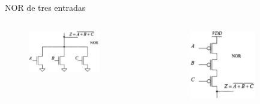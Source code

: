 \documentclass[aspectratio=169,t]{beamer}
\begin{document}
\begin{frame}{NOR de tres entradas}

\begin{columns}

\begin{column}{0.5\textwidth}

\begin{figure}
    \centering
    \includegraphics[width=0.7\textwidth]{figuras/aoi_nor_1.png}
\end{figure}

\end{column}

\begin{column}{0.5\textwidth}

\begin{figure}
    \centering
    \includegraphics[width=0.7\textwidth]{figuras/aoi_nor_2.png}
\end{figure}

\end{column}

\end{columns}
    
\end{frame}
\end{document}
